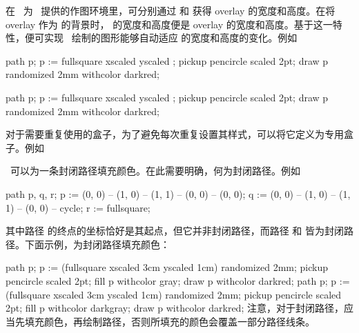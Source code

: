 \starttyping
{}
\stoptyping
{}

在 \ConTeXt\ 为 \MetaPost\ 提供的作图环境里，可分别通过 \type{\overlaywidth} 和 \type{\overlayheight} 获得 overlay 的宽度和高度。在将 overlay 作为 \type{\framed} 的背景时，\type{\framed} 的宽度和高度便是 overlay 的宽度和高度。基于这一特性，便可实现 \MetaPost\ 绘制的图形能够自动适应 \type{\framed} 的宽度和高度的变化。例如

\starttyping[option=MP]
path p;
p := fullsquare xscaled \overlaywidth yscaled \overlayheight;
pickup pencircle scaled 2pt;
draw p randomized 2mm withcolor darkred;
\stopuseMPgraphic

\stoptyping

path p;
p := fullsquare xscaled \overlaywidth yscaled \overlayheight;
pickup pencircle scaled 2pt;
draw p randomized 2mm withcolor darkred;
\stopuseMPgraphic


对于需要重复使用的盒子，为了避免每次重复设置其样式，可以将它定义为专用盒子。例如

\starttyping[option=TEX]
\stoptyping

\MetaPost\ 可以为一条封闭路径填充颜色。在此需要明确，何为封闭路径。例如

\starttyping[option=MP]
path p, q, r;
p := (0, 0) -- (1, 0) -- (1, 1) -- (0, 0) -- (0, 0);
q := (0, 0) -- (1, 0) -- (1, 1) -- (0, 0) -- cycle;
r := fullsquare;
\stoptyping

\noindent 其中路径  的终点的坐标恰好是其起点，但它并非封闭路径，而路径  和  皆为封闭路径。下面示例，为封闭路径填充颜色：

\starttyping[option=MP]
path p;
p := (fullsquare xscaled 3cm yscaled 1cm) randomized 2mm;
pickup pencircle scaled 2pt;
fill p withcolor gray;
draw p withcolor darkred;
\stoptyping
\startMPcode
path p;
p := (fullsquare xscaled 3cm yscaled 1cm) randomized 2mm;
pickup pencircle scaled 2pt;
fill p withcolor darkgray;
draw p withcolor darkred;
\stopMPcode
\noindent 注意，对于封闭路径，应当先填充颜色，再绘制路径，否则所填充的颜色会覆盖一部分路径线条。